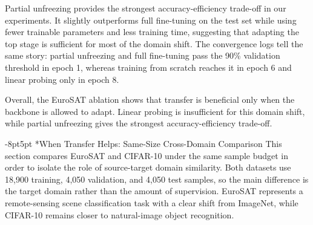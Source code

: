 \documentclass[10pt,twocolumn,letterpaper]{article}
\makeatletter
\def\cvprsubsection{\@startsection {subsection}{2}{\z@}
   {-8pt}{5pt} {\normalsize\bfseries}}
\def\cvprssubsect#1{\cvprsubsection*{#1}}
\def\cvprsubsect#1{\cvprsubsection{\texorpdfstring{\hskip -1em.~}{}#1}}
\def\subsection{\@ifstar\cvprssubsect\cvprsubsect}
\makeatother
\begin{document}
Partial unfreezing provides the strongest accuracy-efficiency trade-off in our experiments. It slightly outperforms full fine-tuning on the test set while using fewer trainable parameters and less training time, suggesting that adapting the top stage is sufficient for most of the domain shift. The convergence logs tell the same story: partial unfreezing and full fine-tuning pass the 90\% validation threshold in epoch 1, whereas training from scratch reaches it in epoch 6 and linear probing only in epoch 8.

Overall, the EuroSAT ablation shows that transfer is beneficial only when the backbone is allowed to adapt. Linear probing is insufficient for this domain shift, while partial unfreezing gives the strongest accuracy-efficiency trade-off.

\subsection{When Transfer Helps: Same-Size Cross-Domain Comparison}
This section compares EuroSAT and CIFAR-10 under the same sample budget in order to isolate the role of source-target domain similarity. Both datasets use 18,900 training, 4,050 validation, and 4,050 test samples, so the main difference is the target domain rather than the amount of supervision. EuroSAT represents a remote-sensing scene classification task with a clear shift from ImageNet, while CIFAR-10 remains closer to natural-image object recognition.

\begin{table}[!htbp]
\centering
\small
\caption{Cross-domain comparison.}
\label{tab:domain}
\end{table}
\end{document}
